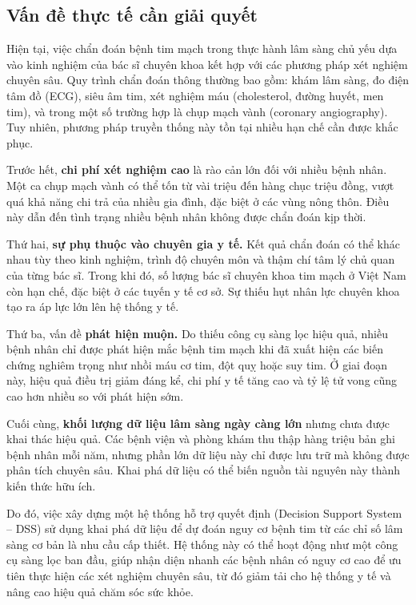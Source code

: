 \subsection{Vấn đề thực tế cần giải quyết}

Hiện tại, việc chẩn đoán bệnh tim mạch trong thực hành lâm sàng chủ yếu dựa vào kinh nghiệm của bác sĩ chuyên khoa kết hợp với các phương pháp xét nghiệm chuyên sâu. Quy trình chẩn đoán thông thường bao gồm: khám lâm sàng, đo điện tâm đồ (ECG), siêu âm tim, xét nghiệm máu (cholesterol, đường huyết, men tim), và trong một số trường hợp là chụp mạch vành (coronary angiography). Tuy nhiên, phương pháp truyền thống này tồn tại nhiều hạn chế cần được khắc phục.

Trước hết, \textbf{chi phí xét nghiệm cao} là rào cản lớn đối với nhiều bệnh nhân. Một ca chụp mạch vành có thể tốn từ vài triệu đến hàng chục triệu đồng, vượt quá khả năng chi trả của nhiều gia đình, đặc biệt ở các vùng nông thôn. Điều này dẫn đến tình trạng nhiều bệnh nhân không được chẩn đoán kịp thời.

Thứ hai, \textbf{sự phụ thuộc vào chuyên gia y tế.} Kết quả chẩn đoán có thể khác nhau tùy theo kinh nghiệm, trình độ chuyên môn và thậm chí tâm lý chủ quan của từng bác sĩ. Trong khi đó, số lượng bác sĩ chuyên khoa tim mạch ở Việt Nam còn hạn chế, đặc biệt ở các tuyến y tế cơ sở. Sự thiếu hụt nhân lực chuyên khoa tạo ra áp lực lớn lên hệ thống y tế.

Thứ ba, vấn đề \textbf{phát hiện muộn.} Do thiếu công cụ sàng lọc hiệu quả, nhiều bệnh nhân chỉ được phát hiện mắc bệnh tim mạch khi đã xuất hiện các biến chứng nghiêm trọng như nhồi máu cơ tim, đột quỵ hoặc suy tim. Ở giai đoạn này, hiệu quả điều trị giảm đáng kể, chi phí y tế tăng cao và tỷ lệ tử vong cũng cao hơn nhiều so với phát hiện sớm.

Cuối cùng, \textbf{khối lượng dữ liệu lâm sàng ngày càng lớn} nhưng chưa được khai thác hiệu quả. Các bệnh viện và phòng khám thu thập hàng triệu bản ghi bệnh nhân mỗi năm, nhưng phần lớn dữ liệu này chỉ được lưu trữ mà không được phân tích chuyên sâu. Khai phá dữ liệu có thể biến nguồn tài nguyên này thành kiến thức hữu ích.

Do đó, việc xây dựng một hệ thống hỗ trợ quyết định (Decision Support System -- DSS) sử dụng khai phá dữ liệu để dự đoán nguy cơ bệnh tim từ các chỉ số lâm sàng cơ bản là nhu cầu cấp thiết. Hệ thống này có thể hoạt động như một công cụ sàng lọc ban đầu, giúp nhận diện nhanh các bệnh nhân có nguy cơ cao để ưu tiên thực hiện các xét nghiệm chuyên sâu, từ đó giảm tải cho hệ thống y tế và nâng cao hiệu quả chăm sóc sức khỏe.


